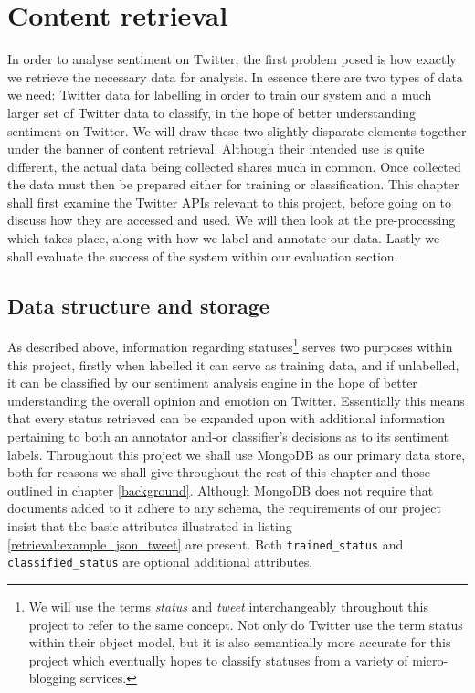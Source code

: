 \chapter{Content retrieval}
\label{retrieval}

In order to analyse sentiment on Twitter, the first problem posed is how exactly we retrieve the necessary data for analysis. In essence there are two types of data we need: Twitter data for labelling in order to train our system and a much larger set of Twitter data to classify, in the hope of better understanding sentiment on Twitter. We will draw these two slightly disparate elements together under the banner of content retrieval. Although their intended use is quite different, the actual data being collected shares much in common. Once collected the data must then be prepared either for training or classification. This chapter shall first examine the Twitter APIs relevant to this project, before going on to discuss how they are accessed and used. We will then look at the pre-processing which takes place, along with how we label and annotate our data. Lastly we shall evaluate the success of the system within our evaluation section.

\section{Data structure and storage}
\label{retrieval:data}

As described above, information regarding statuses\footnote{We will use the terms \emph{status} and \emph{tweet} interchangeably throughout this project to refer to the same concept. Not only do Twitter use the term status within their object model, but it is also semantically more accurate for this project which eventually hopes to classify statuses from a variety of micro-blogging services.} serves two purposes within this project, firstly when labelled it can serve as training data, and if unlabelled, it can be classified by our sentiment analysis engine in the hope of better understanding the overall opinion and emotion on Twitter. Essentially this means that every status retrieved can be expanded upon with additional information pertaining to both an annotator and-or classifier's decisions as to its sentiment labels. Throughout this project we shall use MongoDB as our primary data store, both for reasons we shall give throughout the rest of this chapter and those outlined in chapter \ref{background}. Although MongoDB does not require that documents added to it adhere to any schema, the requirements of our project insist that the basic attributes illustrated in listing \ref{retrieval:example_json_tweet} are present. Both \texttt{trained\-\_status} and \texttt{classified\-\_status} are optional additional attributes.

